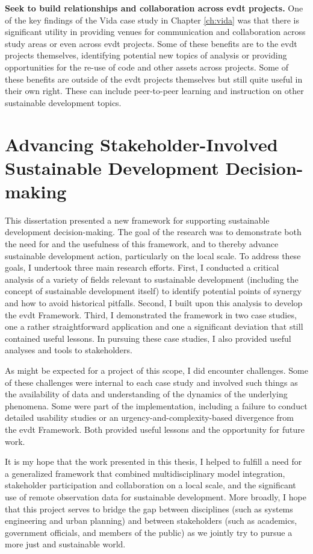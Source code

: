\textbf{Seek to build relationships and collaboration across \ac{evdt} projects.} One of the key findings of the Vida case study in Chapter \ref{ch:vida} was that there is significant utility in providing venues for communication and collaboration across study areas or even across \ac{evdt} projects. Some of these benefits are to the \ac{evdt} projects themselves, identifying potential new topics of analysis or providing opportunities for the re-use of code and other assets across projects. Some of these benefits are outside of the \ac{evdt} projects themselves but still quite useful in their own right. These can include peer-to-peer learning and instruction on other sustainable development topics.
 

\section{Advancing Stakeholder-Involved Sustainable Development Decision-making}

This dissertation presented a new framework for supporting sustainable development decision-making. The goal of the research was to demonstrate both the need for and the usefulness of this framework, and to thereby advance sustainable development action, particularly on the local scale. To address these goals, I undertook three main research efforts. First, I conducted a critical analysis of a variety of fields relevant to sustainable development (including the concept of sustainable development itself) to identify potential points of synergy and how to avoid historical pitfalls. Second, I built upon this analysis to develop the \acf{evdt} Framework. Third, I demonstrated the framework in two case studies, one a rather straightforward application and one a significant deviation that still contained useful lessons. In pursuing these case studies, I also provided useful analyses and tools to stakeholders.

As might be expected for a project of this scope, I did encounter challenges. Some of these challenges were internal to each case study and involved such things as the availability of data and understanding of the dynamics of the underlying phenomena. Some were part of the implementation, including a failure to conduct detailed usability studies or an urgency-and-complexity-based divergence from the \ac{evdt} Framework. Both provided useful lessons and the opportunity for future work.

It is my hope that the work presented in this thesis, I helped to fulfill a need for a generalized framework that combined multidisciplinary model integration, stakeholder participation and collaboration on a local scale, and the significant use of remote observation data for sustainable development. More broadly, I hope that this project serves to bridge the gap between disciplines (such as systems engineering and urban planning) and between stakeholders (such as academics, government officials, and members of the public) as we jointly try to pursue a more just and sustainable world.


